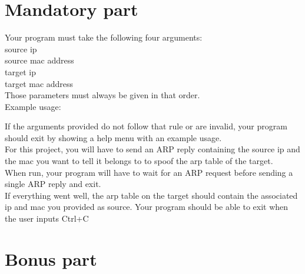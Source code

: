 \documentclass{42-en}
\begin{document}
\chapter{Mandatory part}

    Your program must take the following four arguments:\\
    source ip\\
    source mac address\\
    target ip\\
    target mac address\\
    Those parameters must always be given in that order.\\

        Example usage:

    If the arguments provided do not follow that rule or are invalid, your program should exit by showing a help menu with an example usage.\\

    For this project, you will have to send an ARP reply containing the source ip and the mac you want to tell it belongs to
    to spoof the arp table of the target.\\
    When run, your program will have to wait for an ARP request before sending a single ARP reply and exit.\\
    If everything went well, the arp table on the target should contain the associated ip and mac you provided as source.
    Your program should be able to exit when the user inputs Ctrl+C


\chapter{Bonus part}
\end{document}
